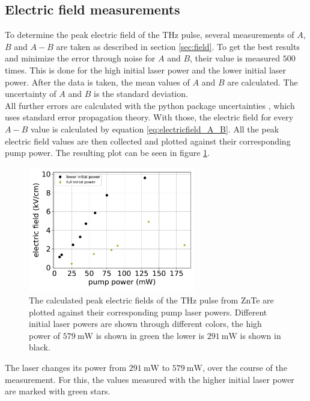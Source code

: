 \subsection{Electric field measurements}
\label{sec:znte_electricfield}
To determine the peak electric field of the $\si{\tera\hertz}$ pulse, several measurements of $A$, $B$ and $A-B$ are taken as described in section \ref{sec:field}.
To get the best results and minimize the error through noise for $A$ and $B$, their value is measured $500$ times.
This is done for the high initial laser power and the lower initial laser power.
After the data is taken, the mean values of $A$ and $B$ are calculated.
The uncertainty of $A$ and $B$ is the standard deviation.
\\
All further errors are calculated with the python package uncertainties \cite{uncertainties}, which uses standard error propagation theory.
With those, the electric field for every $A-B$ value is calculated by equation \eqref{eq:electricfield_A_B}.
All the peak electric field values are then collected and plotted against their corresponding pump power.
The resulting plot can be seen in figure \ref{fig:znte_electricfield}.\FloatBarrier
\begin{figure}
    \centering
    \includegraphics[width=0.65\textwidth]{Plots/eltric_field_ZnTe.pdf}
    \caption{The calculated peak electric fields of the $\si{\tera\hertz}$ pulse from ZnTe are plotted against their corresponding pump laser powers.
    Different initial laser powers are shown through different colors, the high power of $\SI{579}{\milli\W}$ is shown in green the lower is $\SI{291}{\milli\W}$ is shown in black.}
    \label{fig:znte_electricfield}
\end{figure}\FloatBarrier
The laser changes its power from $\SI{291}{\milli\W}$ to $\SI{579}{\milli\W}$, over the course of the measurement. 
For this, the values measured with the higher initial laser power are marked with green stars.
